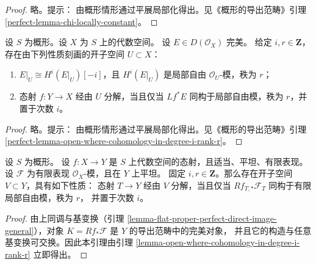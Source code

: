 \begin{proof}
略。提示：
由概形情形通过平展局部化得出。见《概形的导出范畴》引理
\ref{perfect-lemma-chi-locally-constant}。
\end{proof}

\begin{lemma}
\label{lemma-open-where-cohomology-in-degree-i-rank-r}
设 $S$ 为概形。设 $X$ 为 $S$ 上的代数空间。
设 $E \in D(\mathcal{O}_X)$ 完美。
给定 $i, r \in \mathbf{Z}$，存在由下列性质刻画的开子空间
$U \subset X$：
\begin{enumerate}
\item $E|_U \cong H^i(E|_U)[-i]$，且 $H^i(E|_U)$ 是局部自由
$\mathcal{O}_U$-模，秩为 $r$；
\item 态射 $f : Y \to X$ 经由 $U$ 分解，当且仅当
$Lf^*E$ 同构于局部自由模，秩为 $r$，并置于次数 $i$。
\end{enumerate}
\end{lemma}

\begin{proof}
略。提示：
由概形情形通过平展局部化得出。见《概形的导出范畴》引理
\ref{perfect-lemma-open-where-cohomology-in-degree-i-rank-r}。
\end{proof}

\begin{lemma}
\label{lemma-open-where-cohomology-in-degree-i-rank-r-geometric}
设 $S$ 为概形。
设 $f : X \to Y$ 是 $S$ 上代数空间的态射，且适当、平坦、有限表现。
设 $\mathcal{F}$ 为有限表现 $\mathcal{O}_X$-模，且在 $Y$ 上平坦。
固定 $i, r \in \mathbf{Z}$。那么存在开子空间
$V \subset Y$，具有如下性质：
态射 $T \to Y$ 经由 $V$ 分解，当且仅当
$Rf_{T, *}\mathcal{F}_T$ 同构于有限局部自由模，秩为 $r$，
并置于次数 $i$。
\end{lemma}

\begin{proof}
由上同调与基变换（引理
\ref{lemma-flat-proper-perfect-direct-image-general}），对象
$K = Rf_*\mathcal{F}$ 是 $Y$ 的导出范畴中的完美对象，
并且它的构造与任意基变换可交换。因此本引理由引理
\ref{lemma-open-where-cohomology-in-degree-i-rank-r} 立即得出。
\end{proof}

